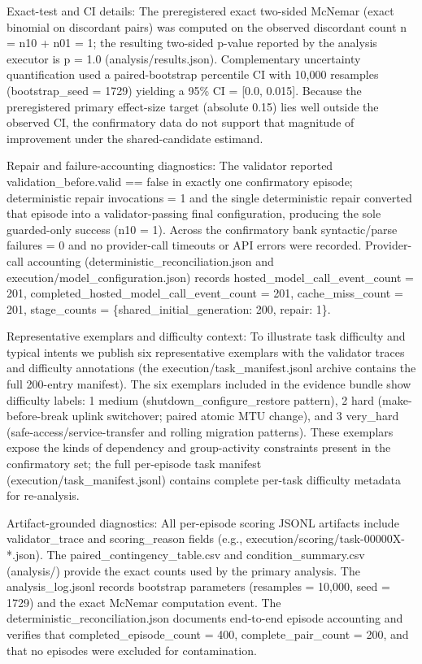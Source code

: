 \documentclass[conference]{IEEEtran}
\begin{document}
Exact-test and CI details: The preregistered exact two-sided McNemar (exact binomial on discordant pairs) was computed on the observed discordant count n = n10 + n01 = 1; the resulting two-sided p-value reported by the analysis executor is p = 1.0 (analysis/results.json). Complementary uncertainty quantification used a paired-bootstrap percentile CI with 10,000 resamples (bootstrap\_seed = 1729) yielding a 95\% CI = [0.0, 0.015]. Because the preregistered primary effect-size target (absolute 0.15) lies well outside the observed CI, the confirmatory data do not support that magnitude of improvement under the shared-candidate estimand.

Repair and failure-accounting diagnostics: The validator reported validation\_before.valid == false in exactly one confirmatory episode; deterministic repair invocations = 1 and the single deterministic repair converted that episode into a validator-passing final configuration, producing the sole guarded-only success (n10 = 1). Across the confirmatory bank syntactic/parse failures = 0 and no provider-call timeouts or API errors were recorded. Provider-call accounting (deterministic\_reconciliation.json and execution/model\_configuration.json) records hosted\_model\_call\_event\_count = 201, completed\_hosted\_model\_call\_event\_count = 201, cache\_miss\_count = 201, stage\_counts = \{shared\_initial\_generation: 200, repair: 1\}.

Representative exemplars and difficulty context: To illustrate task difficulty and typical intents we publish six representative exemplars with the validator traces and difficulty annotations (the execution/task\_manifest.jsonl archive contains the full 200-entry manifest). The six exemplars included in the evidence bundle show difficulty labels: 1 medium (shutdown\_configure\_restore pattern), 2 hard (make-before-break uplink switchover; paired atomic MTU change), and 3 very\_hard (safe-access/service-transfer and rolling migration patterns). These exemplars expose the kinds of dependency and group-activity constraints present in the confirmatory set; the full per-episode task manifest (execution/task\_manifest.jsonl) contains complete per-task difficulty metadata for re-analysis.

Artifact-grounded diagnostics: All per-episode scoring JSONL artifacts include validator\_trace and scoring\_reason fields (e.g., execution/scoring/task-00000X-*.json). The paired\_contingency\_table.csv and condition\_summary.csv (analysis/) provide the exact counts used by the primary analysis. The analysis\_log.jsonl records bootstrap parameters (resamples = 10,000, seed = 1729) and the exact McNemar computation event. The deterministic\_reconciliation.json documents end-to-end episode accounting and verifies that completed\_episode\_count = 400, complete\_pair\_count = 200, and that no episodes were excluded for contamination.
\end{document}

